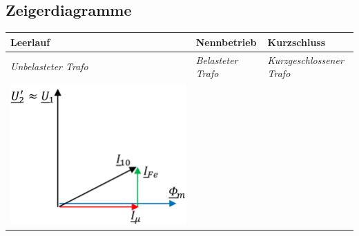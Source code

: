 \subsection{Zeigerdiagramme}
\begin{tabular}{|l|l|l|}
	\hline
	\textbf{Leerlauf} & 
	\textbf{Nennbetrieb} & 
	\textbf{Kurzschluss} \\ \hline
	
	\rule{0pt}{10pt} \textit{Unbelasteter Trafo} & 
	\rule{0pt}{10pt} \textit{Belasteter Trafo} & 
	\rule{0pt}{10pt} \textit{Kurzgeschlossener Trafo} \\ 
	
	\begin{minipage}{0.25\textwidth}
		\includegraphics[height=0.95\textwidth]{bilder/trafo_leerlauf.png}
	\end{minipage} & 
	\begin{minipage}{0.25\textwidth}

\end{minipage}
\end{tabular}
